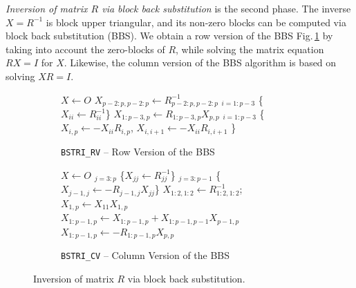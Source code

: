 \documentclass{llncs}
\begin{document}
\textit{Inversion of matrix $R$ via block back substitution} 
is the second phase. The inverse $X = R^{-1}$ is block upper triangular,
and its non-zero blocks can be computed
via block back substitution (BBS).
We obtain a row version of the BBS Fig.\,\ref{alg:BSTRI_RV}
by taking into account the zero-blocks of $R$,
while solving the matrix equation $R X = I$ for $X$. 
Likewise, the column version of the BBS algorithm is based on 
solving $X R = I$.
\begin{figure}[t]%
  \centering
  \begin{subfigure}[t]{0.45\linewidth}%
    \begin{algorithm}[H]

      \BlankLine

      $X \gets O$\; 
      $X_{p-2:p,p-2:p}\gets R_{p-2:p,p-2:p}^{-1}$\;
      \Batched$_{i = 1:p-3}$ \{$X_{ii}\gets R_{ii}^{-1}$\} \;
      $X_{1:p-3,p}\gets R_{1:p-3,p} X_{p,p} $ \;
      \Batched$_{i = 1:p-3}$ \{$X_{i,p}\gets -X_{ii}  R_{i,p}$, $X_{i,i+1}\gets -X_{ii}  R_{i,i+1}$ \} \;
    \end{algorithm}    
    \caption{{\tt BSTRI\_RV} -- Row Version of the BBS
      \label{alg:BSTRI_RV}}
  \end{subfigure}
  \hfill
  \begin{subfigure}[t]{0.54\linewidth}%
    \begin{algorithm}[H]

      \BlankLine

      $X \gets O$\; 
      \Batched$_{j = 3:p}$ \{$X_{jj}\gets R_{jj}^{-1}$\}\;
      \Batched$_{j = 3:p-1}$ \{$X_{j-1,j}\gets -R_{j-1,j} X_{jj} $\}\;
      $X_{1:2,1:2}\gets R_{1:2,1:2}^{-1}$; $X_{1,p}\gets X_{11} X_{1,p} $\;
      $X_{1:p-1,p}\gets X_{1:p-1,p} + X_{1:p-1,p-1} X_{p-1,p}$\;
      $X_{1:p-1,p}\gets -R_{1:p-1,p} X_{p,p} $\;%
    \end{algorithm}    
    \caption{{\tt BSTRI\_CV} -- Column Version of the BBS
      \label{alg:BSTRI_CV}}
  \end{subfigure}
  \caption[]{Inversion of matrix $R$ via block back substitution.\footnotemark
    \label{alg:BSTRI}}
\end{figure}
\end{document}
